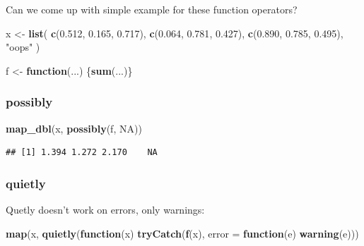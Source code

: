 \documentclass[]{book}
\newenvironment{Shaded}{\begin{snugshade}}{\end{snugshade}}
\newcommand{\ControlFlowTok}[1]{\textcolor[rgb]{0.13,0.29,0.53}{\textbf{#1}}}
\newcommand{\DataTypeTok}[1]{\textcolor[rgb]{0.13,0.29,0.53}{#1}}
\newcommand{\FloatTok}[1]{\textcolor[rgb]{0.00,0.00,0.81}{#1}}
\newcommand{\KeywordTok}[1]{\textcolor[rgb]{0.13,0.29,0.53}{\textbf{#1}}}
\newcommand{\NormalTok}[1]{#1}
\newcommand{\OtherTok}[1]{\textcolor[rgb]{0.56,0.35,0.01}{#1}}
\newcommand{\StringTok}[1]{\textcolor[rgb]{0.31,0.60,0.02}{#1}}
\begin{document}
Can we come up with simple example for these function operators?

\begin{Shaded}
\begin{Highlighting}[]
\NormalTok{x <-}\StringTok{ }\KeywordTok{list}\NormalTok{(}
  \KeywordTok{c}\NormalTok{(}\FloatTok{0.512}\NormalTok{, }\FloatTok{0.165}\NormalTok{, }\FloatTok{0.717}\NormalTok{),}
  \KeywordTok{c}\NormalTok{(}\FloatTok{0.064}\NormalTok{, }\FloatTok{0.781}\NormalTok{, }\FloatTok{0.427}\NormalTok{),}
  \KeywordTok{c}\NormalTok{(}\FloatTok{0.890}\NormalTok{, }\FloatTok{0.785}\NormalTok{, }\FloatTok{0.495}\NormalTok{),}
  \StringTok{"oops"}
\NormalTok{)}

\NormalTok{f <-}\StringTok{ }\ControlFlowTok{function}\NormalTok{(...) \{}\KeywordTok{sum}\NormalTok{(...)\}}
\end{Highlighting}
\end{Shaded}

\hypertarget{possibly}{%
\subsubsection*{possibly}\label{possibly}}

\begin{Shaded}
\begin{Highlighting}[]
\KeywordTok{map_dbl}\NormalTok{(x, }\KeywordTok{possibly}\NormalTok{(f, }\OtherTok{NA}\NormalTok{))}
\end{Highlighting}
\end{Shaded}

\begin{verbatim}
## [1] 1.394 1.272 2.170    NA
\end{verbatim}

\hypertarget{quietly}{%
\subsubsection*{quietly}\label{quietly}}

Quetly doesn't work on errors, only warnings:

\begin{Shaded}
\begin{Highlighting}[]
\KeywordTok{map}\NormalTok{(x, }\KeywordTok{quietly}\NormalTok{(}\ControlFlowTok{function}\NormalTok{(x) }\KeywordTok{tryCatch}\NormalTok{(}\KeywordTok{f}\NormalTok{(x), }\DataTypeTok{error =} \ControlFlowTok{function}\NormalTok{(e) }\KeywordTok{warning}\NormalTok{(e)))}
\end{Highlighting}
\end{Shaded}
\end{document}
